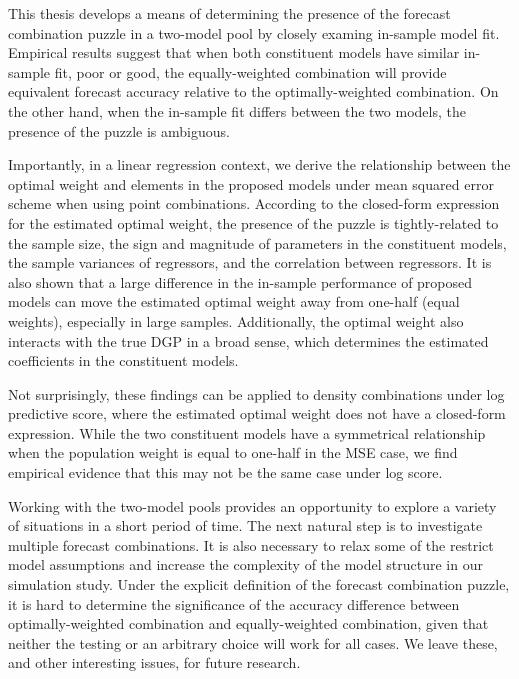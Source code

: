 \documentclass{monashthesis}
\begin{document}
This thesis develops a means of determining the presence of the forecast combination puzzle in a two-model pool by closely examing in-sample model fit. Empirical results suggest that when both constituent models have similar in-sample fit, poor or good, the equally-weighted combination will provide equivalent forecast accuracy relative to the optimally-weighted combination. On the other hand, when the in-sample fit differs between the two models, the presence of the puzzle is ambiguous.

Importantly, in a linear regression context, we derive the relationship between the optimal weight and elements in the proposed models under mean squared error scheme when using point combinations. According to the closed-form expression for the estimated optimal weight, the presence of the puzzle is tightly-related to the sample size, the sign and magnitude of parameters in the constituent models, the sample variances of regressors, and the correlation between regressors. It is also shown that a large difference in the in-sample performance of proposed models can move the estimated optimal weight away from one-half (equal weights), especially in large samples. Additionally, the optimal weight also interacts with the true DGP in a broad sense, which determines the estimated coefficients in the constituent models.

Not surprisingly, these findings can be applied to density combinations under log predictive score, where the estimated optimal weight does not have a closed-form expression. While the two constituent models have a symmetrical relationship when the population weight is equal to one-half in the MSE case, we find empirical evidence that this may not be the same case under log score.

Working with the two-model pools provides an opportunity to explore a variety of situations in a short period of time. The next natural step is to investigate multiple forecast combinations. It is also necessary to relax some of the restrict model assumptions and increase the complexity of the model structure in our simulation study. Under the explicit definition of the forecast combination puzzle, it is hard to determine the significance of the accuracy difference between optimally-weighted combination and equally-weighted combination, given that neither the testing or an arbitrary choice will work for all cases. We leave these, and other interesting issues, for future research.

\appendix
\end{document}

